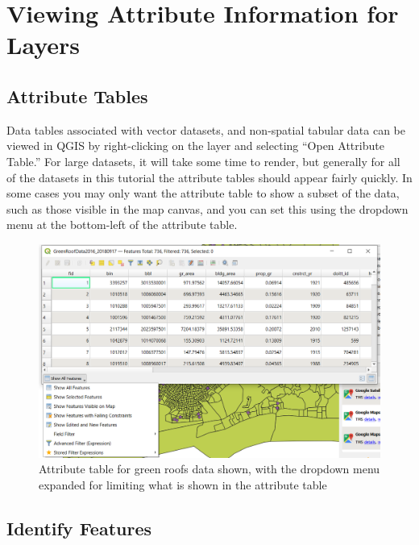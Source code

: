 \documentclass[
  letterpaper,
  DIV=11,
  numbers=noendperiod]{scrreprt}
\begin{document}
\hypertarget{viewing-attribute-information-for-layers}{%
\section{Viewing Attribute Information for
Layers}\label{viewing-attribute-information-for-layers}}

\hypertarget{attribute-tables}{%
\subsection{Attribute Tables}\label{attribute-tables}}

Data tables associated with vector datasets, and non-spatial tabular
data can be viewed in QGIS by right-clicking on the layer and selecting
``Open Attribute Table.'' For large datasets, it will take some time to
render, but generally for all of the datasets in this tutorial the
attribute tables should appear fairly quickly. In some cases you may
only want the attribute table to show a subset of the data, such as
those visible in the map canvas, and you can set this using the dropdown
menu at the bottom-left of the attribute table.

\begin{figure}

{\centering \includegraphics{./images/attribute_table_show_desired_features.png}

}

\caption{Attribute table for green roofs data shown, with the dropdown
menu expanded for limiting what is shown in the attribute table}

\end{figure}

\hypertarget{identify-features}{%
\subsection{Identify Features}\label{identify-features}}
\end{document}
